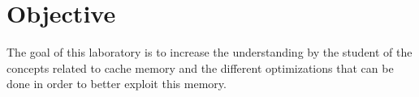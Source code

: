 \section{Objective}

The goal of this laboratory is to increase the understanding by the student of
the concepts related to cache memory and the different optimizations that can
be done in order to better exploit this memory.
